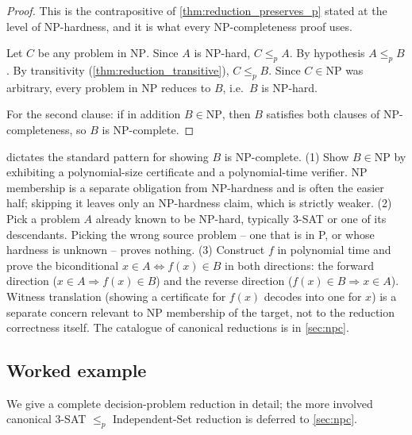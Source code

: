 \begin{proof}
This is the contrapositive of \cref{thm:reduction_preserves_p} stated at the level of NP-hardness, and it is what every NP-completeness proof uses.

Let $C$ be any problem in $\mathrm{NP}$. Since $A$ is NP-hard, $C \le_p A$. By hypothesis $A \le_p B$. By transitivity (\cref{thm:reduction_transitive}), $C \le_p B$. Since $C \in \mathrm{NP}$ was arbitrary, every problem in $\mathrm{NP}$ reduces to $B$, i.e.\ $B$ is NP-hard.

For the second clause: if in addition $B \in \mathrm{NP}$, then $B$ satisfies both clauses of NP-completeness, so $B$ is NP-complete.
\end{proof}

\begin{remark}
 dictates the standard pattern for showing $B$ is NP-complete. (1) Show $B \in \mathrm{NP}$ by exhibiting a polynomial-size certificate and a polynomial-time verifier. NP membership is a separate obligation from NP-hardness and is often the easier half; skipping it leaves only an NP-hardness claim, which is strictly weaker. (2) Pick a problem $A$ already known to be NP-hard, typically 3-SAT or one of its descendants. Picking the wrong source problem -- one that is in P, or whose hardness is unknown -- proves nothing. (3) Construct $f$ in polynomial time and prove the biconditional $x \in A \iff f(x) \in B$ in both directions: the forward direction ($x \in A \Rightarrow f(x) \in B$) and the reverse direction ($f(x) \in B \Rightarrow x \in A$). Witness translation (showing a certificate for $f(x)$ decodes into one for $x$) is a separate concern relevant to NP membership of the target, not to the reduction correctness itself. The catalogue of canonical reductions is in \cref{sec:npc}.
\end{remark}

\subsection{Worked example}

We give a complete decision-problem reduction in detail; the more involved canonical 3-SAT $\le_p$ Independent-Set reduction is deferred to \cref{sec:npc}.

